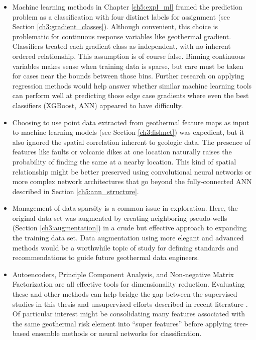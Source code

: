 \begin{itemize}
    \item Machine learning methods in Chapter \ref{ch5:expl_ml} framed the prediction problem as a classification with four distinct labels for assignment (see Section \ref{ch3:gradient_classes}). Although convenient, this choice is problematic for continuous response variables like geothermal gradient. Classifiers treated each gradient class as independent, with no inherent ordered relationship. This assumption is of course false. Binning continuous variables makes sense when training data is sparse, but care must be taken for cases near the bounds between those bins. Further research on applying regression methods would help answer whether similar machine learning tools can perform well at predicting those edge case gradients where even the best classifiers (XGBoost, ANN) appeared to have difficulty.
    \item Choosing to use point data extracted from geothermal feature maps as input to machine learning models (see Section \ref{ch3:fishnet}) was expedient, but it also ignored the spatial correlation inherent to geologic data. The presence of features like faults or volcanic dikes at one location naturally raises the probability of finding the same at a nearby location. This kind of spatial relationship might be better preserved using convolutional neural networks or more complex network architectures that go beyond the fully-connected ANN described in Section \ref{ch5:ann_structure}.
    \item Management of data sparsity is a common issue in exploration. Here, the original data set was augmented by creating neighboring pseudo-wells (Section \ref{ch3:augmentation}) in a crude but effective approach to expanding the training data set. Data augmentation using more elegant and advanced methods would be a worthwhile topic of study for defining standards and recommendations to guide future geothermal data engineers.
    \item Autoencoders, Principle Component Analysis, and Non-negative Matrix Factorization are all effective tools for dimensionality reduction. Evaluating these and other methods can help bridge the gap between the supervised studies in this thesis and unsupervised efforts described in recent literature \citep{smith_characterizing_2021, pepin_new_2018}. Of particular interest might be consolidating many features associated with the same geothermal risk element into “super features” before applying tree-based ensemble methods or neural networks for classification.

\end{itemize}
